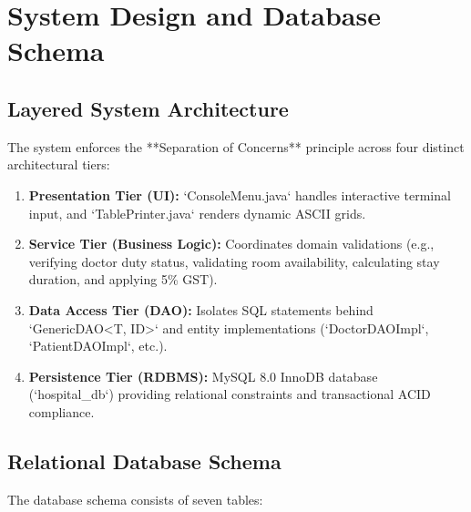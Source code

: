 \documentclass[12pt,a4paper]{article}
\begin{document}
\section{System Design and Database Schema}
\label{sec:design}

\subsection{Layered System Architecture}
The system enforces the **Separation of Concerns** principle across four distinct architectural tiers:
\begin{enumerate}[noitemsep]
    \item \textbf{Presentation Tier (UI):} `ConsoleMenu.java` handles interactive terminal input, and `TablePrinter.java` renders dynamic ASCII grids.
    \item \textbf{Service Tier (Business Logic):} Coordinates domain validations (e.g., verifying doctor duty status, validating room availability, calculating stay duration, and applying 5\% GST).
    \item \textbf{Data Access Tier (DAO):} Isolates SQL statements behind `GenericDAO<T, ID>` and entity implementations (`DoctorDAOImpl`, `PatientDAOImpl`, etc.).
    \item \textbf{Persistence Tier (RDBMS):} MySQL 8.0 InnoDB database (`hospital_db`) providing relational constraints and transactional ACID compliance.
\end{enumerate}

\subsection{Relational Database Schema}
The database schema consists of seven tables:
\end{document}
